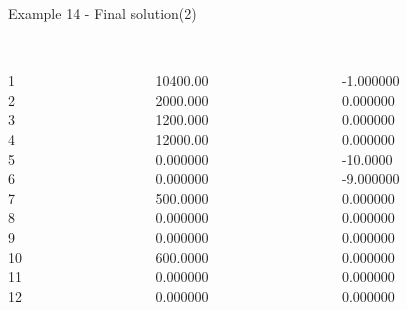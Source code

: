 \begin{frame}{Example 14 - Final solution(2)}
\footnotesize
\begin{columns}[t]
\begin{column}{0.3\textwidth}
\\
1\\
2\\
3\\
4\\
5\\
6\\
7\\
8\\
9\\
10\\
11\\
12\\

\end{column}
\begin{column}{0.3\textwidth}
\\
10400.00\\
2000.000\\
1200.000\\
12000.00\\
0.000000\\
0.000000\\
500.0000\\
0.000000\\
0.000000\\
600.0000\\
0.000000\\
0.000000\\

\end{column}  

\begin{column}{0.3\textwidth}
\\
-1.000000\\
0.000000\\
0.000000\\
0.000000\\
-10.0000\\
-9.000000\\
0.000000\\
0.000000\\
0.000000\\
0.000000\\
0.000000\\
0.000000\\
\end{column}
\end{columns}
\end{frame}
